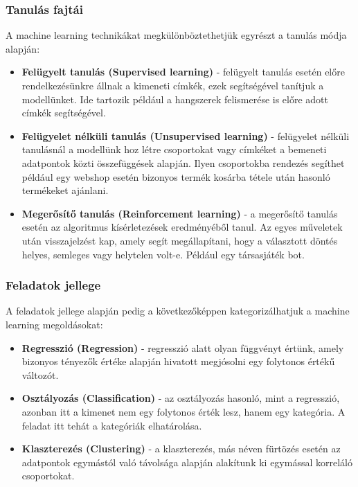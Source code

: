 \subsubsection{Tanulás fajtái}

A machine learning technikákat megkülönböztethetjük egyrészt a tanulás módja alapján:
\begin{itemize}
\item \textbf{Felügyelt tanulás (Supervised learning)} - felügyelt tanulás esetén előre rendelkezésünkre állnak a kimeneti címkék, ezek segítségével tanítjuk a modellünket. Ide tartozik például a hangszerek felismerése is előre adott címkék segítségével.
\item \textbf{Felügyelet nélküli tanulás (Unsupervised learning)} - felügyelet nélküli tanulásnál a modellünk hoz létre csoportokat vagy címkéket a bemeneti adatpontok közti összefüggések alapján. Ilyen csoportokba rendezés segíthet például egy webshop esetén bizonyos termék kosárba tétele után hasonló termékeket ajánlani.
\item\textbf{Megerősítő tanulás (Reinforcement learning)} - a megerősítő tanulás esetén az algoritmus kísérletezések eredményéből tanul. Az egyes műveletek után visszajelzést kap, amely segít megállapítani, hogy a választott döntés helyes, semleges vagy helytelen volt-e. Például egy társasjáték bot. \cite{azure}
\end{itemize}


\subsubsection{Feladatok jellege}

A feladatok jellege alapján pedig a következőképpen kategorizálhatjuk a machine learning megoldásokat:

\begin{itemize}
\item \textbf{Regresszió (Regression)} - regresszió alatt olyan függvényt értünk, amely bizonyos tényezők értéke alapján hivatott megjósolni egy folytonos értékű változót. 
\item \textbf{Osztályozás (Classification)} - az osztályozás hasonló, mint a regresszió, azonban itt a kimenet nem egy folytonos érték lesz, hanem egy kategória. A feladat itt tehát a kategóriák elhatárolása.
	\item \textbf{Klaszterezés (Clustering)} - a klaszterezés, más néven fürtözés esetén az adatpontok egymástól való távolsága alapján alakítunk ki egymással korreláló csoportokat. \cite{deeplearningbook}
\end{itemize}

